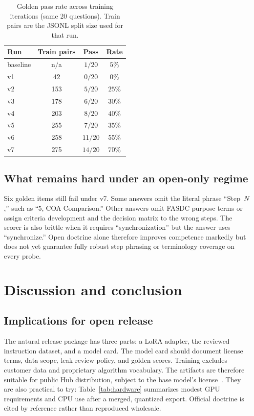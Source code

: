 \documentclass[11pt]{article}
\begin{document}
\begin{table}[t]
  \centering
  \caption{Golden pass rate across training iterations (same 20 questions).
  Train pairs are the JSONL split size used for that run.}
  \label{tab:golden-progress}
  \begin{tabular}{lccc}
    \toprule
    Run & Train pairs & Pass & Rate \\
    \midrule
    baseline & n/a & $1/20$ & $5\%$ \\
    v1 & 42 & $0/20$ & $0\%$ \\
    v2 & 153 & $5/20$ & $25\%$ \\
    v3 & 178 & $6/20$ & $30\%$ \\
    v4 & 203 & $8/20$ & $40\%$ \\
    v5 & 255 & $7/20$ & $35\%$ \\
    v6 & 258 & $11/20$ & $55\%$ \\
    v7 & 275 & $14/20$ & $70\%$ \\
    \bottomrule
  \end{tabular}
\end{table}

\subsection{What remains hard under an open-only regime}
\label{sec:results-hard}

Six golden items still fail under v7.
Some answers omit the literal phrase ``Step~$N$,'' such as ``5, COA
Comparison.''
Other answers omit FASDC purpose terms or assign criteria development and the
decision matrix to the wrong steps.
The scorer is also brittle when it requires ``synchronization'' but the answer
uses ``synchronize.''
Open doctrine alone therefore improves competence markedly but does not yet
guarantee fully robust step phrasing or terminology coverage on every probe.

\section{Discussion and conclusion}
\label{sec:discussion}

\subsection{Implications for open release}
\label{sec:discussion-release}

The natural release package has three parts: a LoRA adapter, the reviewed
instruction dataset, and a model card.
The model card should document license terms, data scope, leak-review policy,
and golden scores.
Training excludes customer data and proprietary algorithm vocabulary.
The artifacts are therefore suitable for public Hub distribution, subject to
the base model's license~\citep{mistral7b}.
They are also practical to try: Table~\ref{tab:hardware} summarizes modest GPU
requirements and CPU use after a merged, quantized export.
Official doctrine is cited by reference rather than reproduced wholesale.
\end{document}
